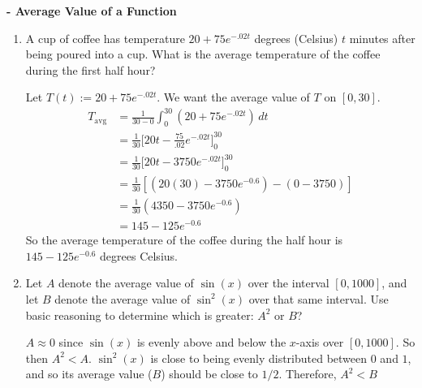 \documentclass[nooutcomes, handout]{ximera}
\renewcommand{\d}{\,d}
\newcommand{\dfn}{\textbf}
\newcommand{\eval}[1]{\bigg[ #1 \bigg]}
\begin{document}
\begin{problem}
\dfn{- Average Value of a Function}
	\begin{enumerate}
	
	\item  A cup of coffee has temperature $20 + 75e^{-.02t}$ degrees (Celsius) $t$ minutes after being poured into a cup.  
	What is the average temperature of the coffee during the first half hour?
		\begin{freeResponse}
		Let $T(t) := 20 + 75e^{-.02t}$.  We want the average value of $T$ on $[0,30]$.
			\begin{align*}
			T_{\text{avg}} &= \frac{1}{30-0} \int_0^{30} \left( 20 + 75e^{-.02t} \right) \d t  \\
			&= \frac{1}{30} \eval{20t - \frac{75}{.02} e^{-.02t}}_0^{30}  \\
			&= \frac{1}{30} \eval{20t - 3750 e^{-.02t}}_0^{30}  \\
			&= \frac{1}{30} \left[ \left( 20(30) - 3750e^{-0.6} \right) - (0 - 3750) \right]  \\
			&= \frac{1}{30} \left( 4350 - 3750e^{-0.6} \right)  \\
			&= 145 - 125e^{-0.6} 
			\end{align*}
		So the average temperature of the coffee during the half hour is $145 - 125e^{-0.6}$ degrees Celsius.
		\end{freeResponse}
		
		
		
	\item  Let $A$ denote the average value of $\sin(x)$ over the interval $[0,1000]$, 
	and let $B$ denote the average value of $\sin^2(x)$ over that same interval.  
	Use basic reasoning to determine which is greater:  $A^2$ or $B$?  
		\begin{freeResponse}
		$A \approx 0$ since $\sin(x)$ is evenly above and below the $x$-axis over $[0,1000]$.  
		So then $A^2 < A$.  
		$\sin^2(x)$ is close to being evenly distributed between $0$ and $1$, and so its average value ($B$) should be close to $1/2$.  
		Therefore, $A^2 < B$
		\end{freeResponse}
		
		
		
	\end{enumerate}
		
		
		

\end{problem}
	
\end{document}
